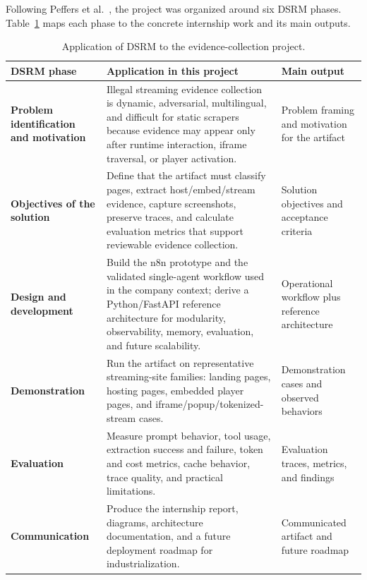 Following Peffers et al.~\cite{peffers-dsrm}, the project was organized around six DSRM
phases. Table~\ref{tab:dsrm-application} maps each phase to the concrete internship
work and its main outputs.

\begin{table}[H]
\centering
\begin{tabularx}{\textwidth}{>{\raggedright\arraybackslash\bfseries}p{2.9cm}
                              >{\raggedright\arraybackslash}X
                              >{\raggedright\arraybackslash}p{4.1cm}}
\toprule
\rowcolor{accent!8}
DSRM phase & Application in this project & Main output \\
\midrule
Problem identification and motivation & Illegal streaming evidence collection is
 dynamic, adversarial, multilingual, and difficult for static scrapers because evidence
 may appear only after runtime interaction, iframe traversal, or player activation. &
 Problem framing and motivation for the artifact \\
Objectives of the solution & Define that the artifact must classify pages, extract
 host/embed/stream evidence, capture screenshots, preserve traces, and calculate
 evaluation metrics that support reviewable evidence collection. & Solution objectives
 and acceptance criteria \\
Design and development & Build the n8n prototype and the validated single-agent
 workflow used in the company context; derive a Python/FastAPI reference architecture
 for modularity, observability, memory, evaluation, and future scalability. &
 Operational workflow plus reference architecture \\
Demonstration & Run the artifact on representative streaming-site families: landing
 pages, hosting pages, embedded player pages, and iframe/popup/tokenized-stream cases. &
 Demonstration cases and observed behaviors \\
Evaluation & Measure prompt behavior, tool usage, extraction success and failure,
 token and cost metrics, cache behavior, trace quality, and practical limitations. &
 Evaluation traces, metrics, and findings \\
Communication & Produce the internship report, diagrams, architecture documentation,
 and a future deployment roadmap for industrialization. & Communicated artifact and
 future roadmap \\
\bottomrule
\end{tabularx}
\caption{Application of DSRM to the evidence-collection project.}
\label{tab:dsrm-application}
\end{table}

